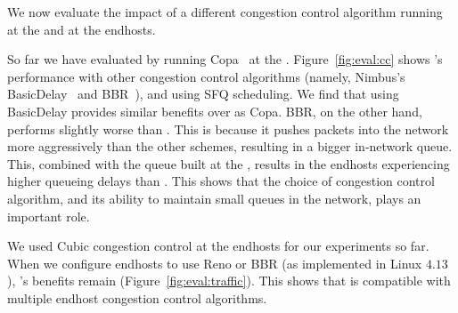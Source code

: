 We now evaluate the impact of a different congestion control algorithm running at the \inbox and at the endhosts.



 So far we have evaluated \name by running Copa~\cite{copa} at the \inbox.  
Figure~\ref{fig:eval:cc} shows \name's performance with other congestion control algorithms (namely, Nimbus's BasicDelay~\cite{nimbus} and BBR~\cite{bbr}), and using SFQ scheduling. 
We find that using BasicDelay provides similar benefits over \baseline as Copa. 
BBR, on the other hand, performs slightly worse than \baseline. 
This is because it pushes packets into the network more aggressively than the other schemes, resulting in a bigger in-network queue.
This, combined with the queue built at the \name, results in the endhosts experiencing higher queueing delays than \baseline. This shows that the choice of congestion control algorithm, and its ability to maintain small queues in the network, plays an important role. 


We used Cubic congestion control at the endhosts for our experiments so far. When we configure endhosts to use Reno or BBR (as implemented in Linux $4.13$), \name's benefits remain (Figure~\ref{fig:eval:traffic}).
This shows that \name is compatible with multiple endhost congestion control algorithms.
